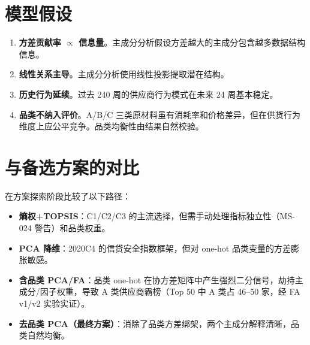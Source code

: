 \documentclass{internal-report}
\begin{document}
\section{模型假设}

\begin{enumerate}
    \item \textbf{方差贡献率 $\propto$ 信息量}。主成分分析假设方差越大的主成分包含越多数据结构信息。
    \item \textbf{线性关系主导}。主成分分析使用线性投影提取潜在结构。
    \item \textbf{历史行为延续}。过去 240 周的供应商行为模式在未来 24 周基本稳定。
    \item \textbf{品类不纳入评价}。A/B/C 三类原材料虽有消耗率和价格差异，但在供货行为维度上应公平竞争。品类均衡性由结果自然校验。
\end{enumerate}

\section{与备选方案的对比}

在方案探索阶段比较了以下路径：

\begin{itemize}
    \item \textbf{熵权+TOPSIS}：C1/C2/C3 的主流选择，但需手动处理指标独立性（MS-024 警告）和品类权重。
    \item \textbf{PCA 降维}：2020C4 的信贷安全指数框架，但对 one-hot 品类变量的方差膨胀敏感。
    \item \textbf{含品类 PCA/FA}：品类 one-hot 在协方差矩阵中产生强烈二分信号，劫持主成分/因子权重，导致 A 类供应商霸榜（Top 50 中 A 类占 46--50 家，经 FA v1/v2 实验实证）。
    \item \textbf{去品类 PCA（最终方案）}：消除了品类方差绑架，两个主成分解释清晰，品类自然均衡。
\end{itemize}
\end{document}
